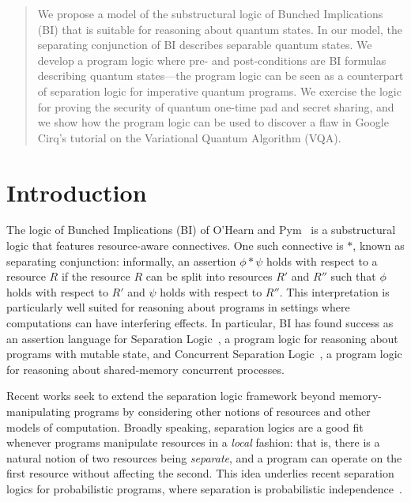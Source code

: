 \documentclass[conference,compsoc, 10pt]{IEEEtran}
\begin{document}
	\maketitle	
	
	\thispagestyle{plain}
	\pagestyle{plain}
	
	\begin{abstract}
    We propose a model of the substructural logic of Bunched Implications (BI) that is suitable for reasoning about quantum states. In our model, the separating conjunction of BI describes separable quantum states. We develop a program logic where pre- and post-conditions are BI formulas describing quantum states---the program logic can be seen as a counterpart of separation logic for imperative quantum programs. We exercise the logic for proving the security of quantum one-time pad and secret sharing, and we show how the program logic can be used to discover a flaw in Google Cirq’s tutorial on the Variational Quantum Algorithm (VQA).
	\end{abstract}
	
	
	
	\section{Introduction}
  The logic of Bunched Implications (BI) of O'Hearn and Pym~\cite{OP99,Pym02,POY04}
        is a substructural logic that features resource-aware
        connectives. One such connective is $*$, known as separating
        conjunction: informally, an assertion $\phi * \psi$ holds with
        respect to a resource $R$ if the resource $R$ can be split
        into resources $R'$ and $R''$ such that $\phi$ holds with
        respect to $R'$ and $\psi$ holds with respect to $R''$. This
        interpretation is particularly well suited for reasoning about
        programs in settings where computations can have interfering
        effects. In particular, BI has found success as an assertion
        language for Separation Logic~\cite{Rey02,ORY01,IO01}, a
        program logic for reasoning about programs with mutable
        state, and Concurrent Separation Logic~\cite{OHe07,Bro07}, a program
        logic for reasoning about shared-memory concurrent processes.

        Recent works seek to extend the separation logic framework beyond
        memory-manipulating programs by considering other notions of resources
        and other models of computation. Broadly speaking, separation logics are
        a good fit whenever programs manipulate resources in a \emph{local}
        fashion: that is, there is a natural notion of two resources being
        \emph{separate}, and a program can operate on the first resource without
        affecting the second. This idea underlies recent separation logics for
        probabilistic programs, where separation is probabilistic
        independence~\cite{BHL19}.
\end{document}
